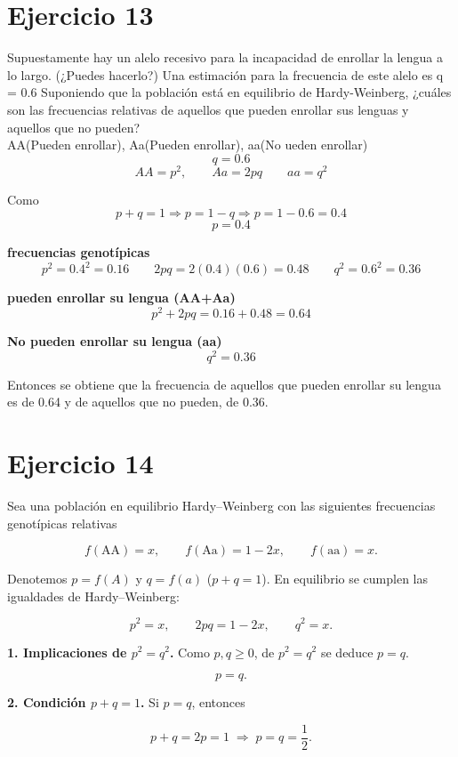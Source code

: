 \documentclass{article}
\begin{document}
\section{Ejercicio 13}
Supuestamente hay un alelo recesivo para la incapacidad de enrollar la lengua a lo largo. (¿Puedes hacerlo?) Una estimación para la frecuencia de este alelo es q = 0.6 Suponiendo que la población está en equilibrio de Hardy-Weinberg, ¿cuáles son las frecuencias relativas de aquellos que pueden enrollar sus lenguas y aquellos que no pueden?\\
AA(Pueden enrollar), Aa(Pueden enrollar), aa(No ueden enrollar)\\
\[q=0.6\]
\[AA = p^{2}, \qquad Aa =2pq \qquad aa= q^{2} \]

Como \[p + q = 1 \Longrightarrow p=1-q \Longrightarrow p=1-0.6=0.4\]
\[p = 0.4\]

\textbf{frecuencias genotípicas}  
\[p^{2}=0.4^{2}=0.16 \qquad 2pq=2(0.4)(0.6)=0.48 \qquad q^{2}=0.6^{2}=0.36\]

\textbf{pueden enrollar su lengua (AA+Aa)}  
\[p^{2}+ 2pq=0.16+0.48 = 0.64\]

\textbf{No pueden enrollar su lengua (aa)}  
\[q^{2}=0.36\]

Entonces se obtiene que la frecuencia de aquellos que pueden enrollar su lengua es de 0.64 y de aquellos que no pueden, de 0.36.\\

\section*{Ejercicio 14}

Sea una población en equilibrio Hardy–Weinberg con las siguientes frecuencias genotípicas relativas

\[
f(\text{AA}) = x, 
\qquad 
f(\text{Aa}) = 1 - 2x, 
\qquad 
f(\text{aa}) = x.
\]

Denotemos \(p = f(A)\) y \(q = f(a)\) (\(p+q=1\)).  
En equilibrio se cumplen las igualdades de Hardy–Weinberg:

\[
p^{2} = x, 
\qquad 
2pq = 1 - 2x, 
\qquad 
q^{2} = x.
\]

\textbf{1. Implicaciones de \(p^{2} = q^{2}\).}  
Como \(p, q \ge 0\), de \(p^{2}=q^{2}\) se deduce \(p=q\).

\[
p = q.
\]

\textbf{2. Condición \(p+q = 1\).}  
Si \(p=q\), entonces

\[
p+q = 2p = 1 
\;\Longrightarrow\;
p = q = \frac{1}{2}.
\]
\end{document}
